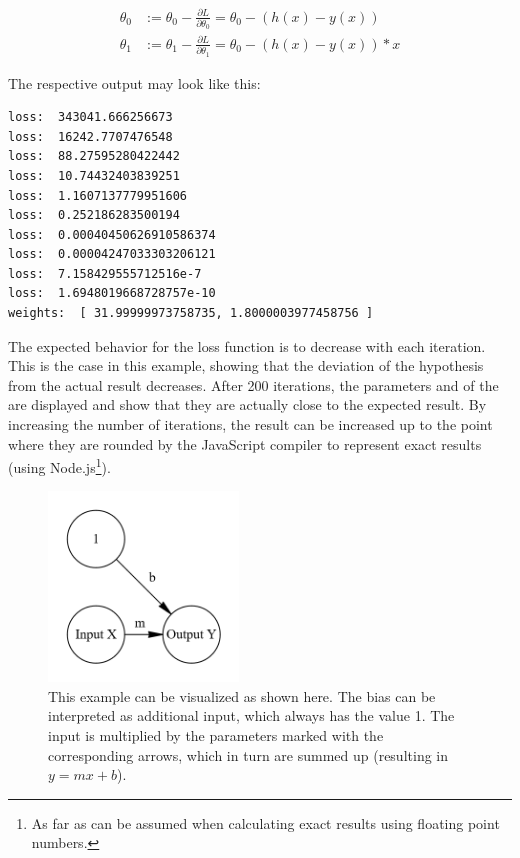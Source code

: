 \begin{equation}
    \begin{split}
        \theta_{0} & := \theta_{0} - \frac{\partial L}{\partial \theta_{0}} =
        \theta_{0} - (h(x) - y(x))  \\
        \theta_{1} & := \theta_{1} - \frac{\partial L}{\partial \theta_{1}} =
        \theta_{0} - (h(x) - y(x)) * x
    \end{split}
    \label{eq:sgd_mse_here}
\end{equation}

The respective output may look like this:
\begin{lstlisting}
loss:  343041.666256673
loss:  16242.7707476548
loss:  88.27595280422442
loss:  10.74432403839251
loss:  1.1607137779951606
loss:  0.252186283500194
loss:  0.00040450626910586374
loss:  0.00004247033303206121
loss:  7.158429555712516e-7
loss:  1.6948019668728757e-10
weights:  [ 31.99999973758735, 1.8000003977458756 ]
\end{lstlisting} 

The expected behavior for the loss function is to decrease with each iteration.
This is the case in this example, showing that the deviation of the hypothesis from the actual result decreases.
After 200 iterations, the parameters  and  of the  are displayed and show that they are actually close to the expected result.
By increasing the number of iterations, the result can be increased up to the point where they are rounded by the JavaScript compiler to represent exact results (using Node.js\footnote{As far as can be assumed when calculating exact results using floating point numbers.}).

\begin{figure}
    \centering
    \caption[Simplest model]{This example can be visualized as shown here. The bias can be interpreted as additional input, which always has the value 1. The input is multiplied by the parameters marked with the corresponding arrows, which in turn are summed up (resulting in $y = mx + b$).}
    \includegraphics[width=0.45\textwidth]{images/1_simplest_nn.png}
\end{figure} 

